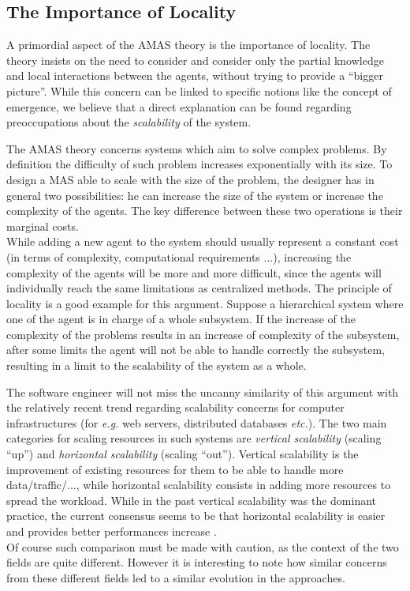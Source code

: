 \subsection{The Importance of Locality}

A primordial aspect of the AMAS theory is the importance of locality. The theory insists on the need to consider and consider only the partial knowledge and local interactions between the agents, without trying to provide a \enquote{bigger picture}. While this concern can be linked to specific notions like the concept of emergence, we believe that a direct explanation can be found regarding preoccupations about the \emph{scalability} of the system.

The AMAS theory concerns systems which aim to solve complex problems. By definition the difficulty of such problem increases exponentially with its size. To design a MAS able to scale with the size of the problem, the designer has in general two possibilities: he can increase the size of the system or increase the complexity of the agents. The key difference between these two operations is their marginal costs.\\
While adding a new agent to the system should usually represent a constant cost (in terms of complexity, computational requirements	...), increasing the complexity of the agents will be more and more difficult, since the agents will individually reach the same limitations as centralized methods. The principle of locality is a good example for this argument. Suppose a hierarchical system where one of the agent is in charge of a whole subsystem. If the increase of the complexity of the problems results in an increase of complexity of the subsystem, after some limits the agent will not be able to handle correctly the subsystem, resulting in a limit to the scalability of the system as a whole.

The software engineer will not miss the uncanny similarity of this argument with the relatively recent trend regarding scalability concerns for computer infrastructures (for \emph{e.g.} web servers, distributed databases \emph{etc.}). The two main categories for scaling resources in such systems are \emph{vertical scalability} (scaling \enquote{up}) and \emph{horizontal scalability} (scaling \enquote{out}). Vertical scalability is the improvement of existing resources for them to be able to handle more data/traffic/..., while horizontal scalability consists in adding more resources to spread the workload. While in the past vertical scalability was the dominant practice, the current consensus seems to be that horizontal scalability is easier and provides better performances increase \cite{michael2007scale}.\\
Of course such comparison must be made with caution, as the context of the two fields are quite different. However it is interesting to note how similar concerns from these different fields led to a similar evolution in the approaches.

